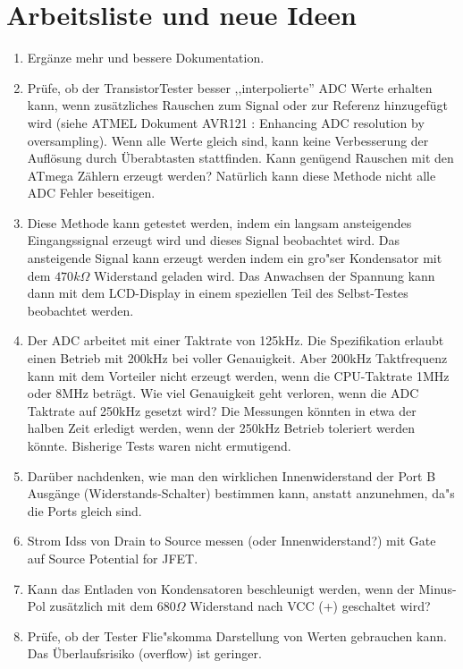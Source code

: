 
\chapter{Arbeitsliste und neue Ideen}
\label{sec:todo}

\begin{enumerate}
\item Erg\"anze mehr und bessere Dokumentation.
\item Pr\"ufe, ob der TransistorTester besser ,,interpolierte''  ADC Werte erhalten kann, wenn zus\"atz\-liches Rauschen zum Signal
oder zur Referenz hinzugef\"ugt wird (siehe ATMEL Dokument AVR121 \cite{AVR121}: Enhancing ADC resolution by oversampling).
Wenn alle Werte gleich sind, kann keine Verbesserung der Aufl\"osung durch \"Uberabtasten stattfinden.
Kann gen\"ugend Rauschen mit den ATmega Z\"ahlern erzeugt werden?
Nat\"urlich kann diese Methode nicht alle ADC Fehler beseitigen.
\item Diese Methode kann getestet werden, indem ein langsam ansteigendes Eingangssignal erzeugt wird und dieses
Signal beobachtet wird.
Das ansteigende Signal kann erzeugt werden indem ein gro"ser Kondensator mit dem \(470k\Omega\) Widerstand geladen wird.
Das Anwachsen der Spannung kann dann mit dem LCD-Display in einem speziellen Teil des Selbst-Testes beobachtet werden.
\item Der ADC arbeitet mit einer Taktrate von 125kHz. Die Spezifikation erlaubt einen Betrieb mit 200kHz bei voller Genauigkeit.
Aber 200kHz Taktfrequenz kann mit dem Vorteiler nicht erzeugt werden, wenn die CPU-Taktrate 1MHz oder 8MHz betr\"agt.
Wie viel Genauigkeit geht verloren, wenn die ADC Taktrate auf 250kHz gesetzt wird?
Die Messungen k\"onnten in etwa der halben Zeit erledigt werden, wenn der 250kHz Betrieb toleriert werden k\"onnte.
Bisherige Tests waren nicht ermutigend.
\item Dar\"uber nachdenken, wie man den wirklichen Innenwiderstand der Port B Aus\-g\"an\-ge (Wider\-stands-Schal\-ter) bestimmen kann,
anstatt anzunehmen, da"s die Ports gleich sind.
\item Strom Idss von Drain to Source messen (oder Innenwiderstand?) mit Gate auf Source Potential for JFET.
\item Kann das Entladen von Kondensatoren beschleunigt werden, wenn der Minus-Pol zus\"atzlich mit dem \(680\Omega\) 
Widerstand nach VCC (+) geschaltet wird?
\item Pr\"ufe, ob der Tester Flie"skomma Darstellung von Werten gebrauchen kann.
Das \"Uberlaufsrisiko (overflow) ist geringer.

\end{enumerate}
